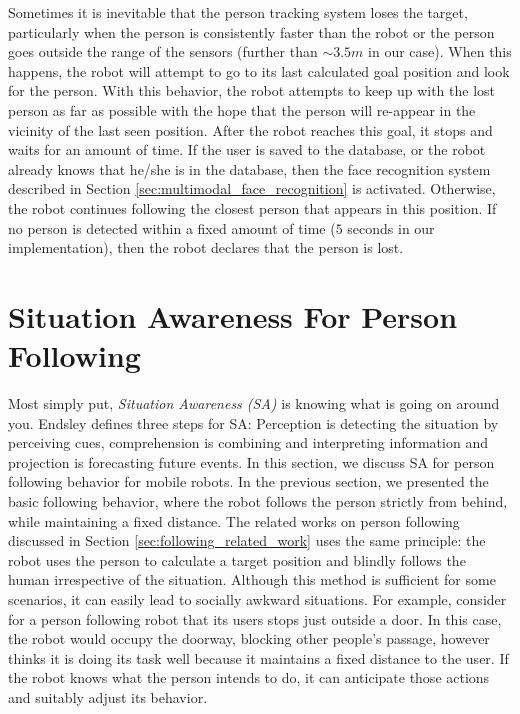 Sometimes it is inevitable that the person tracking system loses the target, particularly when the person is consistently faster than the robot or the person goes outside the range of the sensors (further than $\sim3.5m$ in our case). When this happens, the robot will attempt to go to its last calculated goal position and look for the person. With this behavior, the robot attempts to keep up with the lost person as far as possible with the hope that the person will re-appear in the vicinity of the last seen position. After the robot reaches this goal, it stops and waits for an amount of time. If the user is saved to the database, or the robot already knows that he/she is in the database, then the face recognition system described in Section \ref{sec:multimodal_face_recognition} is activated. Otherwise, the robot continues following the closest person that appears in this position. If no person is detected within a fixed amount of time ($5$ seconds in our implementation), then the robot declares that the person is lost.


\section{Situation Awareness For Person Following}
\label{sec:following_situation_aware}

Most simply put, \textit{Situation Awareness (SA)} is knowing what is going on around you. Endsley \cite{endsley2000situation} defines three steps for SA: Perception is detecting the situation by perceiving cues, comprehension is combining and interpreting information and projection is forecasting future events. In this section, we discuss SA for person following behavior for mobile robots. In the previous section, we presented the basic following behavior, where the robot follows the person strictly from behind, while maintaining a fixed distance. The related works on person following discussed in Section \ref{sec:following_related_work} uses the same principle: the robot uses the person to calculate a target position and blindly follows the human irrespective of the situation. Although this method is sufficient for some scenarios, it can easily lead to socially awkward situations. For example, consider for a person following robot that its users stops just outside a door. In this case, the robot would occupy the doorway, blocking other people's passage, however thinks it is doing its task well because it maintains a fixed distance to the user. If the robot knows what the person intends to do, it can anticipate those actions and suitably adjust its behavior.

